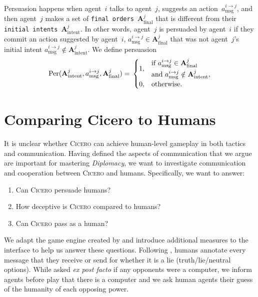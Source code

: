 \documentclass[oneside]{memoir}
\newcommand{\cicero}{\abr{Cicero} }
\newcommand{\abr}[1]{\textsc{#1}}
\begin{document}
Persuasion happens when agent~$i$ talks to agent~$j$, suggests an
action~$a^{i\to j}_{\text{msg}}$, and then agent~$j$ makes a set of
\texttt{final orders}~$\mathbf{A}^{j}_{\text{final}}$ that is different from 
their \texttt{initial intents}~$\mathbf{A}^{j}_{\text{intent}}$. In other words, agent~$j$ is persuaded by agent~$i$ if they commit an action suggested by  agent~$i$, $a^{i\to j}_{\text{msg}} \in \mathbf{A}^{j}_{\text{final}}$ that was not agent~$j$'s initial intent $a^{i\to j}_{\text{msg}} \notin \mathbf{A}^{j}_{\text{intent}}$.
%
We define persuasion 
\begin{equation}
     \text{Per}(\mathbf{A}^{j}_{\text{intent}}, a^{i\to j}_{\text{msg}}, \mathbf{A}^{j}_{\text{final}}) = \\
    \begin{cases}
    1, & 
    \begin{aligned}[c]
    &\text{if } a^{i\to j}_{\text{msg}} \in \mathbf{A}^{j}_{\text{final}} \\
    &\text{and } a^{i\to j}_{\text{msg}} \notin \mathbf{A}^{j}_{\text{intent}},
    \end{aligned} \\
    0, & \text{otherwise.}
    \end{cases}
    \label{eq: per}
\end{equation}

\section{Comparing Cicero to Humans}

It is unclear whether \cicero can
achieve human-level gameplay in both tactics and
communication. Having defined the aspects of communication that we
argue are important for mastering \textit{Diplomacy}, we want to
investigate communication and cooperation between \cicero and
humans. Specifically, we want to answer:
\begin{enumerate}
    \item Can \cicero persuade humans?
    \item How deceptive is \cicero compared to humans? 
    \item Can \cicero pass as a human?
\end{enumerate}

We adapt the game engine created by \citet{paquette-19} and introduce
additional measures  to the interface to help us answer these
questions.
%
Following \citet{peskov2020takes}, humans annotate every message that they receive or send for whether it is a lie (truth/lie/neutral options). While \citet{meta2022human} asked \textit{ex post facto} if any opponents were a computer, we inform agents before play that there is a computer and we ask human agents their guess of the humanity of each opposing power.
\end{document}
